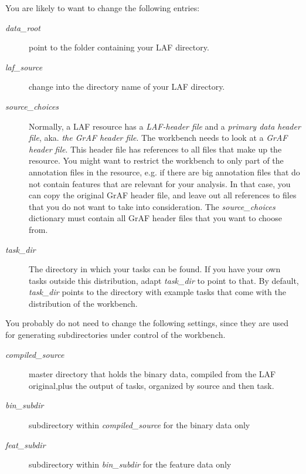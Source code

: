 \documentclass[letterpaper,10pt,english]{sphinxmanual}
\begin{document}
You are likely to want to change the following entries:
\begin{description}
\item[{\emph{data\_root}}] \leavevmode
point to the folder containing your LAF directory.

\item[{\emph{laf\_source}}] \leavevmode
change into the directory name of your LAF directory.

\item[{\emph{source\_choices}}] \leavevmode
Normally, a LAF resource has a \emph{LAF-header file} and a \emph{primary data header file}, aka. \emph{the GrAF header file}.
The workbench needs to look at a \emph{GrAF header file}.
This header file has references to all files that make up the resource.
You might want to restrict the workbench to only part of the annotation files in the resource,
e.g. if there are big annotation files that do not contain features that are relevant for your analysis.
In that case, you can copy the original GrAF header file,
and leave out all references to files that you do not want to take into consideration.
The \emph{source\_choices} dictionary must contain all GrAF header files that you want to choose from.

\end{description}
\label{workbench:task-dir}\begin{description}
\item[{\emph{task\_dir}}] \leavevmode
The directory in which your tasks can be found. If you have your own tasks outside this distribution,
adapt \emph{task\_dir} to point to that. By default, \emph{task\_dir} points to the directory with example tasks
that come with the distribution of the workbench.

\end{description}

You probably do not need to change the following settings, since they are used for generating subdirectories under control of
the workbench.
\begin{description}
\item[{\emph{compiled\_source}}] \leavevmode
master directory that holds the binary data, compiled from the LAF original,plus the output of tasks,
organized by source and then task.

\item[{\emph{bin\_subdir}}] \leavevmode
subdirectory within \emph{compiled\_source} for the binary data only

\item[{\emph{feat\_subdir}}] \leavevmode
subdirectory within \emph{bin\_subdir} for the feature data only

\end{description}
\end{document}
